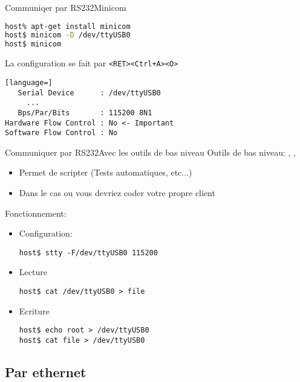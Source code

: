 \begin{frame}[fragile=singleslide]{Communiqer par RS232}{Minicom}
\begin{lstlisting}[language=sh]
host% apt-get install minicom
host$ minicom -D /dev/ttyUSB0
host$ minicom
\end{lstlisting} %
  La configuration se fait par \verb/<RET><Ctrl+A><O>/
\begin{lstlisting}[language=]
   Serial Device      : /dev/ttyUSB0
     ...
   Bps/Par/Bits       : 115200 8N1
Hardware Flow Control : No <- Important
Software Flow Control : No
\end{lstlisting}
\end{frame}


\begin{frame}[fragile=singleslide]{Communiquer par RS232}{Avec les outils de bas niveau}
  Outils de bas niveau: , , 
  \begin{itemize}
  \item Permet de scripter (Tests automatiques, etc...)
  \item Dans le cas ou vous devriez coder votre propre client
  \end{itemize}
  Fonctionnement:
  \begin{itemize}
  \item Configuration:
\begin{lstlisting}
host$ stty -F/dev/ttyUSB0 115200
\end{lstlisting} %
  \item Lecture
\begin{lstlisting}
host$ cat /dev/ttyUSB0 > file
\end{lstlisting} %
  \item Ecriture
\begin{lstlisting}
host$ echo root > /dev/ttyUSB0
host$ cat file > /dev/ttyUSB0
\end{lstlisting} %
  \end{itemize}
\end{frame}

\subsection{Par ethernet}

